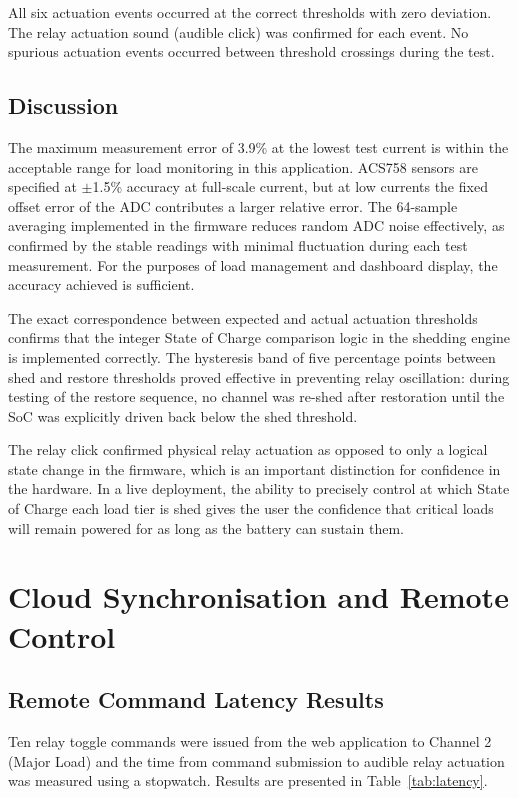 \documentclass[12pt, a4paper]{report}
\begin{document}
{All six actuation events occurred at the correct thresholds with zero
deviation. The relay actuation sound (audible click) was confirmed for
each event. No spurious actuation events occurred between threshold
crossings during the test.

\subsection{Discussion}

The maximum measurement error of 3.9\% at the lowest test current is
within the acceptable range for load monitoring in this application. ACS758
sensors are specified at $\pm$1.5\% accuracy at full-scale current, but
at low currents the fixed offset error of the ADC contributes a larger
relative error. The 64-sample averaging implemented in the firmware
reduces random ADC noise effectively, as confirmed by the stable readings
with minimal fluctuation during each test measurement. For the purposes
of load management and dashboard display, the accuracy achieved is
sufficient.

The exact correspondence between expected and actual actuation thresholds
confirms that the integer State of Charge comparison logic in the shedding
engine is implemented correctly. The hysteresis band of five percentage
points between shed and restore thresholds proved effective in preventing
relay oscillation: during testing of the restore sequence, no channel was
re-shed after restoration until the SoC was explicitly driven back below
the shed threshold.

The relay click confirmed physical relay actuation as opposed to only a
logical state change in the firmware, which is an important distinction
for confidence in the hardware. In a live deployment, the ability to
precisely control at which State of Charge each load tier is shed gives
the user the confidence that critical loads will remain powered for as
long as the battery can sustain them.

\section{Cloud Synchronisation and Remote Control}

\subsection{Remote Command Latency Results}

Ten relay toggle commands were issued from the web application to Channel
2 (Major Load) and the time from command submission to audible relay
actuation was measured using a stopwatch. Results are presented in
Table~\ref{tab:latency}.

}
\end{document}
